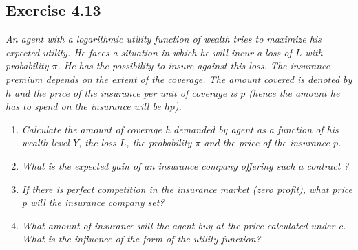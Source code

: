 \documentclass[]{book}
\theoremstyle{definition}
\theoremstyle{definition}
\theoremstyle{remark}
\begin{document}
\subsection{Exercise 4.13}\label{exercise-4.13}

\emph{An agent with a logarithmic utility function of wealth tries to
maximize his expected utility. He faces a situation in which he will
incur a loss of \(L\) with probability \(\pi\). He has the possibility
to insure against this loss. The insurance premium depends on the extent
of the coverage. The amount covered is denoted by \(h\) and the price of
the insurance per unit of coverage is \(p\) (hence the amount he has to
spend on the insurance will be \(hp\)).}
\citep[p.10]{exercises_danthine}

\begin{enumerate}
\def\labelenumi{\alph{enumi}.}
\item
  \emph{Calculate the amount of coverage h demanded by agent as a
  function of his wealth level \(Y\), the loss \(L\), the probability
  \(\pi\) and the price of the insurance \(p\).}
  \citep[p.10]{exercises_danthine}
\item
  \emph{What is the expected gain of an insurance company offering such
  a contract ?} \citep[p.10]{exercises_danthine}
\item
  \emph{If there is perfect competition in the insurance market (zero
  profit), what price p will the insurance company set?}
  \citep[p.10]{exercises_danthine}
\item
  \emph{What amount of insurance will the agent buy at the price
  calculated under c. What is the influence of the form of the utility
  function?} \citep[p.11]{exercises_danthine}
\end{enumerate}


\end{document}
